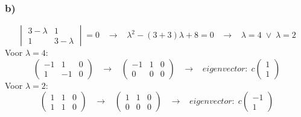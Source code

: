 \documentclass[11pt]{article}
\begin{document}
\subsubsection*{b)}
\[
\begin{vmatrix}
3-\lambda & 1 \\
1 & 3-\lambda
\end{vmatrix}
=0
\;\;\;\longrightarrow\;\;\;
\lambda^2 - (3+3)\lambda + 8 = 0
\;\;\;\longrightarrow\;\;\;
\lambda = 4 \;\vee\; \lambda = 2
\]
Voor $\lambda = 4$: 
\[
\left(
\begin{array}{cc|c}
-1 & 1 & 0 \\
1 & -1 & 0
\end{array}
\right)
\;\;\;\longrightarrow\;\;\;
\left(
\begin{array}{cc|c}
-1 & 1 & 0 \\
0 & 0 & 0
\end{array}
\right)
\;\;\;\longrightarrow\;\;\;
eigenvector:\;
c
\begin{pmatrix}
1\\1
\end{pmatrix}
\]
Voor $\lambda = 2$: 
\[
\left(
\begin{array}{cc|c}
1 & 1 & 0 \\
1 & 1 & 0
\end{array}
\right)
\;\;\;\longrightarrow\;\;\;
\left(
\begin{array}{cc|c}
1 & 1 & 0 \\
0 & 0 & 0
\end{array}
\right)
\;\;\;\longrightarrow\;\;\;
eigenvector:\;
c
\begin{pmatrix}
-1\\1
\end{pmatrix}
\]
\end{document}
